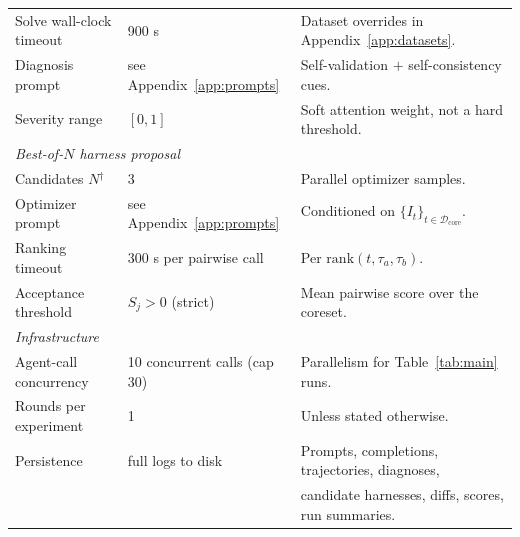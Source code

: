 \begin{table}[t]
\begin{tabular}{lll}
Solve wall-clock timeout    & 900 s                                        & Dataset overrides in Appendix~\ref{app:datasets}. \\
Diagnosis prompt            & see Appendix~\ref{app:prompts}               & Self-validation $+$ self-consistency cues. \\
Severity range              & $[0,1]$                                      & Soft attention weight, not a hard threshold. \\
\midrule
\multicolumn{3}{l}{\textit{Best-of-$N$ harness proposal}} \\
\midrule
Candidates $N$$^{\dagger}$  & 3                                            & Parallel optimizer samples. \\
Optimizer prompt            & see Appendix~\ref{app:prompts}               & Conditioned on $\{I_t\}_{t\in\mathcal{D}_{\mathrm{core}}}$. \\
Ranking timeout             & 300 s per pairwise call                      & Per $\mathrm{rank}(t,\tau_a,\tau_b)$. \\
Acceptance threshold        & $S_j > 0$ (strict)                           & Mean pairwise score over the coreset. \\
\midrule
\multicolumn{3}{l}{\textit{Infrastructure}} \\
\midrule
Agent-call concurrency      & 10 concurrent calls (cap 30)                 & Parallelism for Table~\ref{tab:main} runs. \\
Rounds per experiment       & 1                                            & Unless stated otherwise. \\
Persistence                 & full logs to disk                            & Prompts, completions, trajectories, diagnoses, \\
                            &                                              & candidate harnesses, diffs, scores, run summaries. \\
\bottomrule
\end{tabular}
\end{table}

